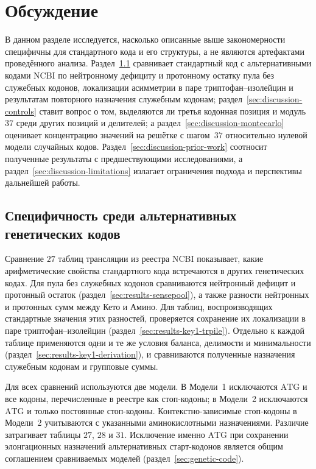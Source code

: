 \documentclass[11pt,a4paper]{article}
\renewcommand{\_}{\origunderscore\allowbreak}
\begin{document}
\section{Обсуждение}
\label{sec:discussion}

В данном разделе исследуется, насколько описанные выше
закономерности специфичны для стандартного кода и его
структуры, а не являются артефактами проведённого анализа.
Раздел~\ref{sec:discussion-trpile-robustness} сравнивает
стандартный код с альтернативными кодами NCBI по
нейтронному дефициту и протонному остатку пула без
служебных кодонов, локализации асимметрии в паре
триптофан--изолейцин и результатам повторного назначения
служебным кодонам;
раздел~\ref{sec:discussion-controls} ставит вопрос о том,
выделяются ли третья кодонная позиция и модуль~$37$ среди
других позиций и делителей; а
раздел~\ref{sec:discussion-montecarlo} оценивает
концентрацию значений на решётке с шагом~$37$ относительно
нулевой модели случайных кодов. Раздел~\ref{sec:discussion-prior-work}
соотносит полученные результаты с предшествующими исследованиями, а
раздел~\ref{sec:discussion-limitations} излагает
ограничения подхода и перспективы дальнейшей работы.

\subsection{Специфичность среди альтернативных генетических кодов}
\label{sec:discussion-trpile-robustness}
\label{sec:results-key1-ncbi}

Сравнение $27$ таблиц трансляции из реестра NCBI
показывает, какие арифметические свойства стандартного
кода встречаются в других генетических кодах.
Для пула без служебных кодонов сравниваются
нейтронный дефицит и протонный остаток
(раздел~\ref{sec:results-sensepool}),
а также разности нейтронных и протонных сумм
между Кето и Амино. Для таблиц, воспроизводящих
стандартные значения этих разностей, проверяется
сохранение их локализации в паре
триптофан--изолейцин
(раздел~\ref{sec:results-key1-trpile}).
Отдельно к каждой таблице применяются одни и те же
условия баланса, делимости и минимальности
(раздел~\ref{sec:results-key1-derivation}), и
сравниваются полученные назначения служебным кодонам
и групповые суммы.

Для всех сравнений используются две модели.
В Модели~1 исключаются
$\mathrm{ATG}$ и все кодоны, перечисленные в реестре
как стоп-кодоны; в Модели~2 исключаются $\mathrm{ATG}$
и только постоянные стоп-кодоны. Контекстно-зависимые
стоп-кодоны в Модели~2 учитываются с указанными
аминокислотными назначениями. Различие затрагивает
таблицы $27$, $28$ и $31$. Исключение именно
$\mathrm{ATG}$ при сохранении элонгационных назначений
альтернативных старт-кодонов является общим соглашением
сравниваемых моделей
(раздел~\ref{sec:genetic-code}).
\end{document}

